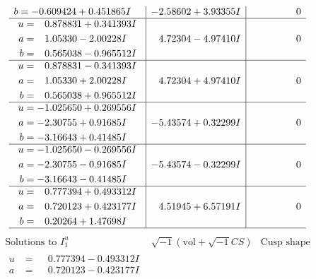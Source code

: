 \documentclass[1p]{elsarticle_modified}
\theoremstyle{definition}
\newcommand{\I}{\sqrt{-1}}
\begin{document}
$$\begin{array}{c|c|c}
\begin{aligned}
b &= -0.609424 + 0.451865 I\end{aligned}
 & -2.58602 + 3.93355 I & \phantom{-0.000000 } 0 \\ \hline\begin{aligned}
u &= \phantom{-}0.878831 + 0.341393 I \\
a &= \phantom{-}1.05330 - 2.00228 I \\
b &= \phantom{-}0.565038 - 0.965512 I\end{aligned}
 & \phantom{-}4.72304 - 4.97410 I & \phantom{-0.000000 } 0 \\ \hline\begin{aligned}
u &= \phantom{-}0.878831 - 0.341393 I \\
a &= \phantom{-}1.05330 + 2.00228 I \\
b &= \phantom{-}0.565038 + 0.965512 I\end{aligned}
 & \phantom{-}4.72304 + 4.97410 I & \phantom{-0.000000 } 0 \\ \hline\begin{aligned}
u &= -1.025650 + 0.269556 I \\
a &= -2.30755 + 0.91685 I \\
b &= -3.16643 + 0.41485 I\end{aligned}
 & -5.43574 + 0.32299 I & \phantom{-0.000000 } 0 \\ \hline\begin{aligned}
u &= -1.025650 - 0.269556 I \\
a &= -2.30755 - 0.91685 I \\
b &= -3.16643 - 0.41485 I\end{aligned}
 & -5.43574 - 0.32299 I & \phantom{-0.000000 } 0 \\ \hline\begin{aligned}
u &= \phantom{-}0.777394 + 0.493312 I \\
a &= \phantom{-}0.720123 + 0.423177 I \\
b &= \phantom{-}0.20264 + 1.47698 I\end{aligned}
 & \phantom{-}4.51945 + 6.57191 I & \phantom{-0.000000 } 0\\
 \hline 
 \end{array}$$\newpage$$\begin{array}{c|c|c}  
\text{Solutions to }I^u_{1}& \I (\text{vol} + \sqrt{-1}CS) & \text{Cusp shape}\\
 \hline 
\begin{aligned}
u &= \phantom{-}0.777394 - 0.493312 I \\
a &= \phantom{-}0.720123 - 0.423177 I \\

\end{aligned}
\end{array}$$
\end{document}
